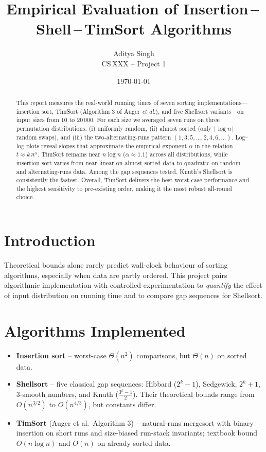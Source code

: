 \documentclass[11pt]{article}
\title{\bf Empirical Evaluation of Insertion\,–\,Shell\,–\,TimSort Algorithms}
\author{Aditya Singh \\ CS XXX – Project 1}
\date{\today}
\begin{document}
\maketitle

\begin{abstract}
This report measures the real-world running times of seven sorting
implementations—insertion sort, TimSort (Algorithm 3 of Auger
\textit{et al.}), and five Shellsort variants—on input sizes from 10 to
20\,000.  For each size we averaged seven runs on three permutation
distributions: (i) uniformly random, (ii) almost sorted (only
$\lfloor\log n\rfloor$ random swaps), and (iii) the two-alternating-runs
pattern $(1,3,5,\dots,2,4,6,\dots)$.  Log–log plots reveal slopes that
approximate the empirical exponent $\alpha$ in the relation
$t\approx k\,n^\alpha$.  TimSort remains near $n\log n$
($\alpha\!\approx\!1.1$) across all distributions, while insertion sort
varies from near‐linear on almost-sorted data to quadratic on random and
alternating-runs data.  Among the gap sequences tested, Knuth’s Shellsort
is consistently the fastest.  Overall, TimSort delivers the best
worst-case performance and the highest sensitivity to pre-existing order,
making it the most robust all-round choice.
\end{abstract}

\section{Introduction}
Theoretical bounds alone rarely predict wall-clock behaviour of sorting
algorithms, especially when data are partly ordered.  This project pairs
algorithmic implementation with controlled experimentation to
\emph{quantify} the effect of input distribution on running time and to
compare gap sequences for Shellsort.

\section{Algorithms Implemented}
\begin{itemize}
  \item \textbf{Insertion sort} –
        worst-case $\Theta(n^{2})$ comparisons, but $\Theta(n)$ on sorted data.
  \item \textbf{Shellsort} – five classical gap sequences:
        Hibbard ($2^{k}-1$), Sedgewick,
        $2^{k}\!+\!1$, 3-smooth numbers, and Knuth
        ($\tfrac{3^{k}-1}{2}$).  Their theoretical bounds range from
        $O(n^{3/2})$ to $O(n^{4/3})$, but constants differ.
  \item \textbf{TimSort} (Auger et al.\ Algorithm 3) –
        natural-runs mergesort with binary insertion on short runs and
        size-biased run-stack invariants; textbook bound $O(n\log n)$ and
        $O(n)$ on already sorted data.
\end{itemize}
\end{document}
